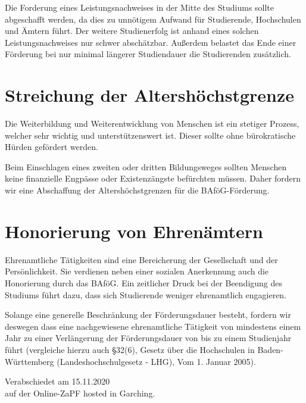 \documentclass[DIV=calc]{scrartcl}
\begin{document}
Die Forderung eines Leistungsnachweises in der Mitte des Studiums sollte abgeschafft werden, da dies zu unnötigem Aufwand für Studierende, Hochschulen und Ämtern führt. Der weitere Studienerfolg ist anhand eines solchen Leistungsnachweises nur schwer abschätzbar. Außerdem belastet das Ende einer Förderung bei nur minimal längerer Studiendauer die Studierenden zusätzlich.

\section{Streichung der Altershöchstgrenze}

Die Weiterbildung und Weiterentwicklung von Menschen ist ein stetiger Prozess, welcher sehr wichtig und unterstützenswert ist. Dieser sollte ohne bürokratische Hürden gefördert werden. 

Beim Einschlagen eines zweiten oder dritten Bildungsweges sollten Menschen keine finanzielle Engpässe oder Existenzängste befürchten müssen. Daher fordern wir eine Abschaffung der Altershöchstgrenzen für die BAföG-Förderung. 

\newpage
\section{Honorierung von Ehrenämtern}

Ehrenamtliche Tätigkeiten sind eine Bereicherung der Gesellschaft und der Persönlichkeit. Sie verdienen neben einer sozialen Anerkennung auch die Honorierung durch das BAföG. Ein zeitlicher Druck bei der Beendigung des Studiums führt dazu, dass sich Studierende weniger ehrenamtlich engagieren. 

Solange eine generelle Beschränkung der Förderungsdauer besteht, fordern wir deswegen dass eine nachgewiesene ehrenamtliche Tätigkeit von mindestens einem Jahr zu einer Verlängerung der Förderungsdauer von bis zu einem Studienjahr führt (vergleiche hierzu auch §32(6), Gesetz über die Hochschulen in Baden-Württemberg (Landeshochschulgesetz - LHG), Vom 1. Januar 2005).

\vspace{1cm}

\vfill
\begin{flushright}
Verabschiedet am 15.11.2020 \\
auf der Online-ZaPF hosted in Garching.
\end{flushright}
\end{document}
